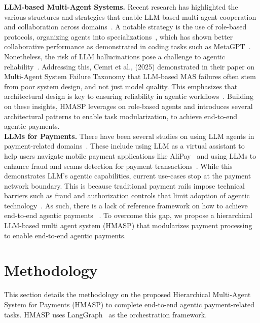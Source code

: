 \documentclass[runningheads]{llncs}
\begin{document}
\noindent\textbf{LLM-based Multi-Agent Systems.}
Recent research has highlighted the various structures and strategies that enable LLM-based multi-agent cooperation and collaboration across domains~\cite{guo2024mascollab,tran2025mascollab}. A notable strategy is the use of role-based protocols, organizing agents into specializations~\cite{guo2024mascollab,hong2024metagpt,tran2025mascollab,wang2024surveyllm-mas}, which has shown better collaborative performance as demonstrated in coding tasks such as MetaGPT~\cite{hong2024metagpt}. 
Nonetheless, the risk of LLM hallucinations pose a challenge to agentic reliability~\cite{guo2024mascollab,huang2025survey,zhang2025sirenhallucination}. Addressing this, Cemri et al., (2025) demonstrated in their paper on Multi-Agent System Failure Taxonomy that LLM-based MAS failures often stem from poor system design, and not just model quality. This emphasizes that architectural design is key to ensuring reliability in agentic workflows~\cite{cemri2025multifail}. Building on these insights, HMASP leverages on role-based agents and introduces several architectural patterns to enable task modularization, to achieve end-to-end agentic payments.\\

\noindent\textbf{LLMs for Payments.}
There have been several studies on using LLM agents in payment-related domains~\cite{dahiphale2024llmscampayments,guan2024llmprocessautomation,qu-etal-2025-llm-fraud}. 
These include using LLM as a virtual assistant to help users navigate mobile payment applications like AliPay~\cite{guan2024llmprocessautomation} and using LLMs to enhance fraud and scams detection for payment transactions~\cite{dahiphale2024llmscampayments,qu-etal-2025-llm-fraud}.
While this demonstrates LLM's agentic capabilities, current use-cases stop at the payment network boundary. This is because traditional payment rails impose technical barriers such as fraud and authorization controls that limit adoption of agentic technology~\cite{dwight2025payments,mckinsey2025agenticpayments}. As such, there is a lack of reference framework on how to achieve end-to-end agentic payments ~\cite{guo2024mascollab,plaat2025agentic,tran2025mascollab}. To overcome this gap, we propose a hierarchical LLM-based multi agent system (HMASP) that modularizes payment processing to enable end-to-end agentic payments.

\section{Methodology}
This section details the methodology on the proposed Hierarchical Multi-Agent System for Payments (HMASP) to complete end-to-end agentic payment-related tasks. HMASP uses LangGraph~\cite{langchain2024langgraph} as the orchestration framework. 
\end{document}
